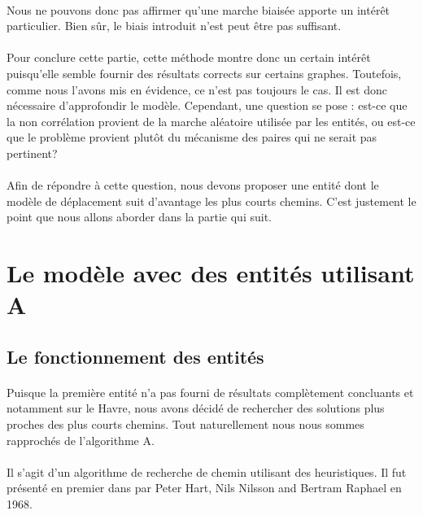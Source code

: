 \documentclass[a4paper, 10pt]{report}
\begin{document}
\paragraph{}Nous ne pouvons donc pas affirmer qu'une marche biaisée apporte un intérêt particulier. Bien sûr, le biais introduit n'est peut être pas suffisant.

\paragraph{}Pour conclure cette partie, cette méthode montre donc un certain intérêt puisqu'elle semble fournir des résultats corrects sur certains graphes. Toutefois, comme nous l'avons mis en évidence, ce n'est pas toujours le cas. Il est donc nécessaire d'approfondir le modèle. Cependant, une question se pose : est-ce que la non corrélation provient de la marche aléatoire utilisée par les entités, ou est-ce que le problème provient plutôt du mécanisme des paires qui ne serait pas pertinent?

\paragraph{}Afin de répondre à cette question, nous devons proposer une entité dont le modèle de déplacement suit d'avantage les plus courts chemins. C'est justement le point que nous allons aborder dans la partie qui suit.

\newpage

	\section{Le modèle avec des entités utilisant A\up{*}}
	
		\subsection{Le fonctionnement des entités}
		
\paragraph{}Puisque la première entité n'a pas fourni de résultats complètement concluants et notamment sur le Havre, nous avons décidé de rechercher des solutions plus proches des plus courts chemins. Tout naturellement nous nous sommes rapprochés de l'algorithme A\up{*}.

\paragraph{}Il s'agit d'un algorithme de recherche de chemin utilisant des heuristiques. Il fut présenté en premier dans \cite{Hart1968AFormalBasis} par Peter Hart, Nils Nilsson and Bertram Raphael en 1968. 
\end{document}
